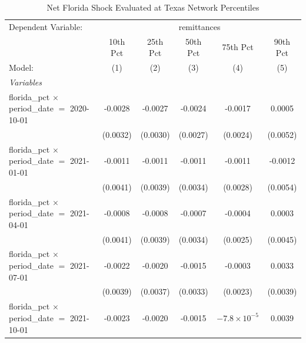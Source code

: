 
\begin{table}[htbp]
   \caption{\label{tab:texas_percentiles} Net Florida Shock Evaluated at Texas Network Percentiles}
   \centering
   \begin{tabular}{lccccc}
      \tabularnewline \midrule \midrule
      Dependent Variable: & \multicolumn{5}{c}{remittances}\\
                                                           & 10th Pct        & 25th Pct               & 50th Pct        & 75th Pct              & 90th Pct \\   
      Model:                                               & (1)             & (2)                    & (3)             & (4)                   & (5)\\  
      \midrule
      \emph{Variables}\\
      florida\_pct $\times$ period\_date $=$ 2020-10-01    & -0.0028         & -0.0027                & -0.0024         & -0.0017               & 0.0005\\   
                                                           & (0.0032)        & (0.0030)               & (0.0027)        & (0.0024)              & (0.0052)\\   
      florida\_pct $\times$ period\_date $=$ 2021-01-01    & -0.0011         & -0.0011                & -0.0011         & -0.0011               & -0.0012\\   
                                                           & (0.0041)        & (0.0039)               & (0.0034)        & (0.0028)              & (0.0054)\\   
      florida\_pct $\times$ period\_date $=$ 2021-04-01    & -0.0008         & -0.0008                & -0.0007         & -0.0004               & 0.0003\\   
                                                           & (0.0041)        & (0.0039)               & (0.0034)        & (0.0025)              & (0.0045)\\   
      florida\_pct $\times$ period\_date $=$ 2021-07-01    & -0.0022         & -0.0020                & -0.0015         & -0.0003               & 0.0033\\   
                                                           & (0.0039)        & (0.0037)               & (0.0033)        & (0.0023)              & (0.0039)\\   
      florida\_pct $\times$ period\_date $=$ 2021-10-01    & -0.0023         & -0.0020                & -0.0015         & $-7.8\times 10^{-5}$  & 0.0039\\   

\end{tabular}
\end{table}
